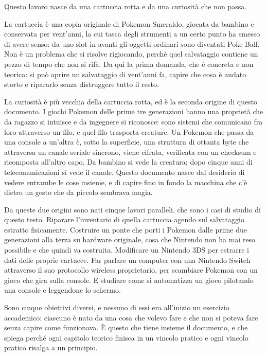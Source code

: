 
Questo lavoro nasce da una cartuccia rotta e da una curiosità che non passa.

La cartuccia è una copia originale di Pokemon Smeraldo, giocata da bambino e conservata per vent'anni, la cui tasca degli strumenti a un certo punto ha smesso di avere senso: da uno slot in avanti gli oggetti ordinari sono diventati Poke Ball. Non è un problema che si risolve rigiocando, perché quel salvataggio contiene un pezzo di tempo che non si rifà. Da qui la prima domanda, che è concreta e non teorica: si può aprire un salvataggio di vent'anni fa, capire che cosa è andato storto e ripararlo senza distruggere tutto il resto.

La curiosità è più vecchia della cartuccia rotta, ed è la seconda origine di questo documento. I giochi Pokemon delle prime tre generazioni hanno una proprietà che da ragazzo si intuisce e da ingegnere si riconosce: sono sistemi che comunicano fra loro attraverso un filo, e quel filo trasporta creature. Un Pokemon che passa da una console a un'altra è, sotto la superficie, una struttura di ottanta byte che attraversa un canale seriale sincrono, viene cifrata, verificata con un checksum e ricomposta all'altro capo. Da bambino si vede la creatura; dopo cinque anni di telecomunicazioni si vede il canale. Questo documento nasce dal desiderio di vedere entrambe le cose insieme, e di capire fino in fondo la macchina che c'è dietro un gesto che da piccolo sembrava magia.

Da queste due origini sono nati cinque lavori paralleli, che sono i casi di studio di questo testo. Riparare l'inventario di quella cartuccia agendo sul salvataggio estratto fisicamente. Costruire un ponte che porti i Pokemon dalle prime due generazioni alla terza su hardware originale, cosa che Nintendo non ha mai reso possibile e che quindi va costruita. Modificare un Nintendo 3DS per estrarre i dati delle proprie cartucce. Far parlare un computer con una Nintendo Switch attraverso il suo protocollo wireless proprietario, per scambiare Pokemon con un gioco che gira sulla console. E studiare come si automatizza un gioco pilotando una console e leggendone lo schermo.

Sono cinque obiettivi diversi, e nessuno di essi era all'inizio un esercizio accademico: ciascuno è nato da una cosa che volevo fare e che non si poteva fare senza capire come funzionava. È questo che tiene insieme il documento, e che spiega perché ogni capitolo teorico finisca in un vincolo pratico e ogni vincolo pratico risalga a un principio.

